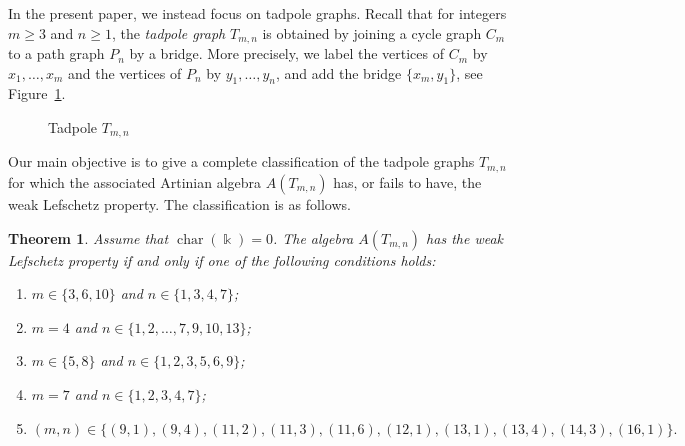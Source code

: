 \documentclass[12pt,twoside]{amsart}
\newtheorem{theorem}[thm]{Theorem}
\theoremstyle{definition}
\theoremstyle{mystyle}
\begin{document}
In the present paper, we instead focus on tadpole graphs. Recall that for integers \(m\geq 3\) and \(n\geq 1\), the \emph{tadpole graph} \(T_{m,n}\) is obtained by joining a cycle graph \(C_m\) to a path graph \(P_n\) by a bridge. More precisely, we label the vertices of \(C_m\) by \(x_1,\ldots,x_m\) and the vertices of \(P_n\) by \(y_1,\ldots,y_n\), and add the bridge \(\{x_m,y_1\}\), see Figure~\ref{fig1}. 
\begin{figure}[!ht]
	\caption{Tadpole $T_{m,n}$}
	\label{fig1}
\end{figure}

Our main objective is to give a complete classification of the tadpole graphs
\(T_{m,n}\) for which the associated Artinian algebra \(A(T_{m,n})\) has, or fails
to have, the weak Lefschetz property. The classification is as follows.

\begin{theorem} \label{thm:mainTheorem_WLP}
Assume that $\operatorname{char}(\Bbbk)=0$.
The algebra \(A(T_{m,n})\) has the weak Lefschetz property if and only if one of the following conditions holds:
	\begin{enumerate}[\rm (i)]
		\item \(m\in\{3,6,10\}\) and \(n\in\{1,3,4,7\}\);
		\item \(m=4\) and \(n\in\{1,2,\ldots,7,9,10,13\}\);
		\item \(m\in\{5,8\}\) and \(n\in\{1,2,3,5,6,9\}\);
		\item \(m=7\) and \(n\in\{1,2,3,4,7\}\);
		\item $
		(m,n)\in
		\{(9,1),(9,4),(11,2),(11,3),(11,6),(12,1),
		(13,1),(13,4),(14,3),(16,1)\}.$
	\end{enumerate}
\end{theorem}
\end{document}

